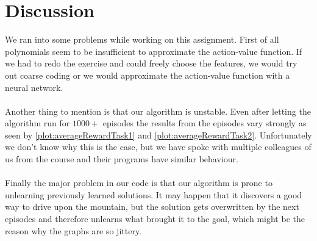 \documentclass{article}
\begin{document}
	
	\vspace{-1cm}
	\section{Discussion}
	\label{sec:Discussion}
	We ran into some problems while working on this assignment. First of all polynomials seem to be insufficient to approximate the action-value function. If we had to redo the exercise and could freely choose the features, we would try out coarse coding or we would approximate the action-value function with a neural network. \\
	\\
	Another thing to mention is that our algorithm is unstable. Even after letting the algorithm run for $1000+$ episodes the results from the episodes vary strongly as seen by \autoref{plot:averageRewardTask1} and \autoref{plot:averageRewardTask2}. Unfortunately we don't know why this is the case, but we have spoke with multiple colleagues of us from the course and their programs have similar behaviour. \\
	\\
	Finally the major problem in our code is that our algorithm is prone to unlearning previously learned solutions. It may happen that it discovers a good way to drive upon the mountain, but the solution gets overwritten by the next episodes and therefore unlearns what brought it to the goal, which might be the reason why the graphs are so jittery. 
	
	
	
	
\end{document}
